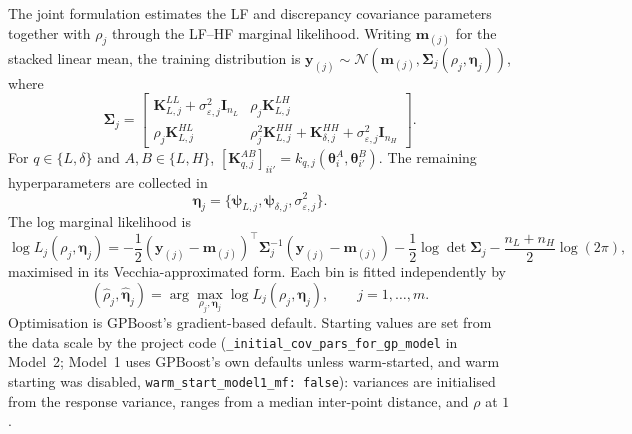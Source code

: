 \documentclass[12pt, letterpaper, oneside]{article}
\begin{document}
The joint formulation estimates the LF and discrepancy covariance parameters
together with $\rho_j$ through the LF--HF marginal likelihood. Writing
$\mathbf m_{(j)}$ for the stacked linear mean, the training distribution is
$\mathbf{y}_{(j)}\sim\mathcal{N}(\mathbf m_{(j)},
\bm\Sigma_j(\rho_j,\bm\eta_j))$, where
\begin{equation}
    \bm\Sigma_j =
    \begin{bmatrix}
        \mathbf{K}_{L,j}^{LL}
          + \sigma^2_{\varepsilon,j}\mathbf{I}_{n_L}
        & \rho_j\mathbf{K}_{L,j}^{LH} \\[4pt]
        \rho_j\mathbf{K}_{L,j}^{HL}
        & \rho_j^2\mathbf{K}_{L,j}^{HH}
          + \mathbf{K}_{\delta,j}^{HH}
          + \sigma^2_{\varepsilon,j}\mathbf{I}_{n_H}
    \end{bmatrix}.
    \label{eq:model1_blockcov}
\end{equation}
For $q\in\{L,\delta\}$ and $A,B\in\{L,H\}$,
$[\mathbf{K}_{q,j}^{AB}]_{ii'}
=k_{q,j}(\bm\theta_i^A,\bm\theta_{i'}^B)$.
The remaining hyperparameters are collected in
\begin{equation}
    \bm\eta_j
    = \{\bm\psi_{L,j},\bm\psi_{\delta,j},
         \sigma^2_{\varepsilon,j}\}.
    \label{eq:model1-hyperparameters}
\end{equation}
The log marginal likelihood is
\begin{equation}
    \log L_j(\rho_j,\bm\eta_j)
    = -\frac{1}{2}(\mathbf{y}_{(j)}-\mathbf m_{(j)})^\top
        \bm\Sigma_j^{-1}(\mathbf{y}_{(j)}-\mathbf m_{(j)})
      -\frac{1}{2}\log\det\bm\Sigma_j
      -\frac{n_L+n_H}{2}\log(2\pi),
    \label{eq:model1_lml}
\end{equation}
maximised in its Vecchia-approximated form. Each bin is fitted independently by
\begin{equation}
    (\widehat\rho_j,\widehat{\bm\eta}_j)
    = \arg\max_{\rho_j,\bm\eta_j}
      \log L_j(\rho_j,\bm\eta_j),
    \qquad j=1,\ldots,m.
    \label{eq:model1_criterion}
\end{equation}
Optimisation is GPBoost's gradient-based default. Starting values are set from
the data scale by the project code
(\texttt{\_initial\_cov\_pars\_for\_gp\_model} in Model~2; Model~1 uses
GPBoost's own defaults unless warm-started, and warm starting was disabled,
\texttt{warm\_start\_model1\_mf: false}): variances are initialised from the
response variance, ranges from a median inter-point distance, and $\rho$ at
$1$.
\end{document}
